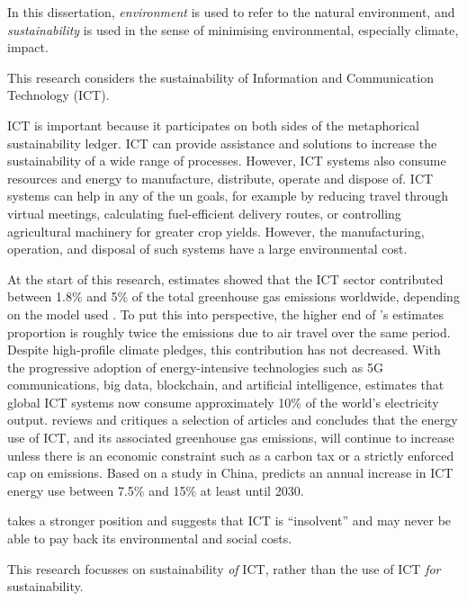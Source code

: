 In this dissertation, \emph{environment} is used to refer to the natural environment, and \emph{sustainability} is used in the sense of minimising environmental, especially climate, impact.

\begin{leftbar}
This research considers the sustainability of Information and Communication Technology (\gls{ICT}).
\end{leftbar}

\label{A4} \label{A6}
\gls{ICT} is important because it participates on both sides of the metaphorical \gls{sustainability ledger}. \gls{ICT} can provide assistance and solutions to increase the sustainability of a wide range of processes. However, \gls{ICT} systems also consume resources and energy to manufacture, distribute, operate and dispose of. \gls{ICT} systems can help in any of the \gls{un goals}, for example by reducing travel through virtual meetings, calculating fuel-efficient delivery routes, or controlling agricultural machinery for greater crop yields. However, the manufacturing, operation, and disposal of such systems have a large environmental cost. 

\label{E8}
At the start of this research, estimates showed that the \gls{ICT} sector contributed between 1.8\% and 5\% of the total greenhouse gas emissions worldwide, depending on the model used \citep{Belkhir2018}. To put this into perspective, the higher end of \citeauthor{Belkhir2018}'s estimates proportion is roughly twice the emissions due to air travel over the same period. Despite high-profile climate pledges, this contribution has not decreased. With the progressive adoption of energy-intensive technologies such as 5G communications, big data, blockchain, and artificial intelligence, \citet{Gelenbe2023} estimates that global \gls{ICT} systems now consume approximately 10\% of the world's electricity output. \citet{Freitag2021} reviews and critiques a selection of articles and concludes that the energy use of \gls{ICT}, and its associated greenhouse gas emissions, will continue to increase unless there is an economic constraint such as a carbon tax or a strictly enforced cap on emissions. Based on a study in China, \citet{Wang2022} predicts an annual increase in \gls{ICT} energy use between 7.5\% and 15\% at least until 2030.

\citet{Becker2023} takes a stronger position and suggests that \gls{ICT} is \enquote{insolvent} and may never be able to pay back its environmental and social costs.

\begin{leftbar}
This research focusses on sustainability \emph{of} \gls{ICT}, rather than the use of \gls{ICT} \emph{for} \gls{sustainability}.
\end{leftbar}

